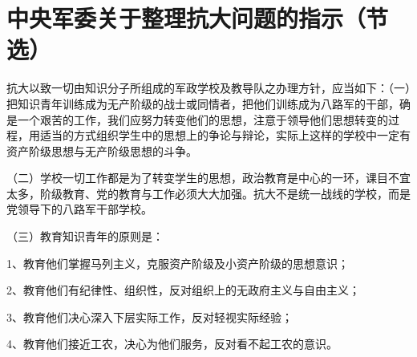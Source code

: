 \section[中央军委关于整理抗大问题的指示（节选）（一九三九年七月二十五日）]{中央军委关于整理抗大问题的指示（节选）}


抗大以致一切由知识分子所组成的军政学校及教导队之办理方针，应当如下：（一）把知识青年训练成为无产阶级的战士或同情者，把他们训练成为八路军的干部，确是一个艰苦的工作，我们应努力转变他们的思想，注意于领导他们思想转变的过程，用适当的方式组织学生中的思想上的争论与辩论，实际上这样的学校中一定有资产阶级思想与无产阶级思想的斗争。

（二）学校一切工作都是为了转变学生的思想，政治教育是中心的一环，课目不宜太多，阶级教育、党的教育与工作必须大大加强。抗大不是统一战线的学校，而是党领导下的八路军干部学校。

（三）教育知识青年的原则是：

1、教育他们掌握马列主义，克服资产阶级及小资产阶级的思想意识；

2、教育他们有纪律性、组织性，反对组织上的无政府主义与自由主义；

3、教育他们决心深入下层实际工作，反对轻视实际经验；

4、教育他们接近工农，决心为他们服务，反对看不起工农的意识。

